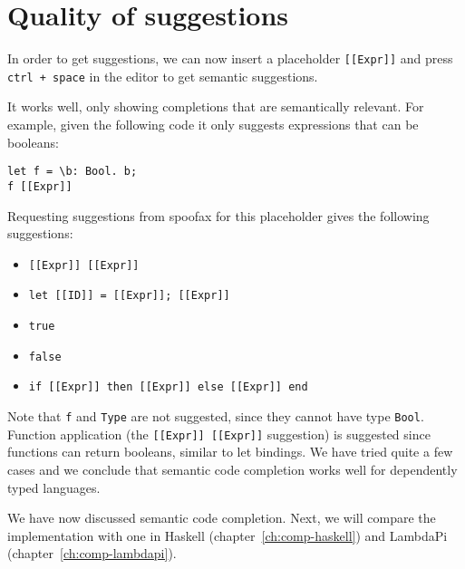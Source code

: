 \section{Quality of suggestions}
In order to get suggestions, we can now insert a placeholder \verb|[[Expr]]| and press \verb|ctrl + space| in the editor to get semantic suggestions.

It works well, only showing completions that are semantically relevant. For example, given the following code it only suggests expressions that can be booleans:
\begin{lstlisting}
let f = \b: Bool. b;
f [[Expr]]
\end{lstlisting}
Requesting suggestions from spoofax for this placeholder gives the following suggestions:
 \begin{itemize}
 	\item \verb|[[Expr]] [[Expr]]|
 	\item \verb|let [[ID]] = [[Expr]]; [[Expr]]|
 	\item \verb|true|
 	\item \verb|false|
 	\item \verb|if [[Expr]] then [[Expr]] else [[Expr]] end|
 \end{itemize}

Note that \verb|f| and \verb|Type| are not suggested, since they cannot have type \verb|Bool|. Function application (the \verb|[[Expr]] [[Expr]]| suggestion) is suggested since functions can return booleans, similar to let bindings. We have tried quite a few cases and we conclude that semantic code completion works well for dependently typed languages.

We have now discussed semantic code completion. Next, we will compare the implementation with one in Haskell (chapter~\ref{ch:comp-haskell}) and LambdaPi (chapter~\ref{ch:comp-lambdapi}). 
